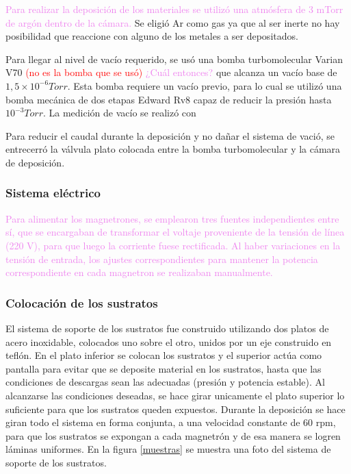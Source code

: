\documentclass[12pt]{article}
\theoremstyle{definition}
\theoremstyle{remark}
\begin{document}
\textcolor{violet}{Para realizar la deposición de los materiales se utilizó una atmósfera de 3 mTorr de argón dentro de la cámara.} Se eligió Ar como gas ya que al ser inerte no hay posibilidad que reaccione con alguno de los metales a ser depositados.


Para llegar al nivel de vacío requerido, se usó una bomba turbomolecular Varian V70 \textcolor{red}{(no es la bomba que se usó)} \textcolor{violet}{¿Cuál entonces?} que alcanza un vacío base de $1,5 \times 10^{-6}Torr$. Esta bomba requiere un vacío previo, para lo cual se utilizó una bomba mecánica de dos etapas Edward Rv8 capaz de reducir la presión hasta $10^{-3}Torr$. La medición de vacío se realizó con 


Para reducir el caudal durante la deposición y no dañar el sistema de vació, se entrecerró la válvula plato colocada entre la bomba turbomolecular y la cámara de deposición.


\subsubsection{Sistema eléctrico}

\textcolor{violet}{Para alimentar los magnetrones, se emplearon tres fuentes independientes entre sí, que se encargaban de transformar el voltaje proveniente de la tensión de línea (220 V), para que luego la corriente fuese rectificada. Al haber variaciones en la tensión de entrada, los ajustes correspondientes para mantener la potencia correspondiente en cada magnetron se realizaban manualmente.} 

\subsubsection{Colocación de los sustratos}

El sistema de soporte de los sustratos fue construido utilizando dos platos de acero inoxidable, colocados uno sobre el otro, unidos por un eje construido en teflón. En el plato inferior se colocan los sustratos y el superior actúa como pantalla para evitar que se deposite material en los sustratos, hasta que las condiciones de descargas sean las adecuadas (presión y potencia estable). Al alcanzarse las condiciones deseadas, se hace girar unicamente el plato superior lo suficiente para que los sustratos queden expuestos. Durante la deposición se hace giran todo el sistema en forma conjunta, a una velocidad constante de 60 rpm, para que los sustratos se expongan a cada magnetrón y de esa manera se logren láminas uniformes. En la figura \ref{muestras} se muestra una foto del sistema de soporte de los sustratos.
\end{document}
